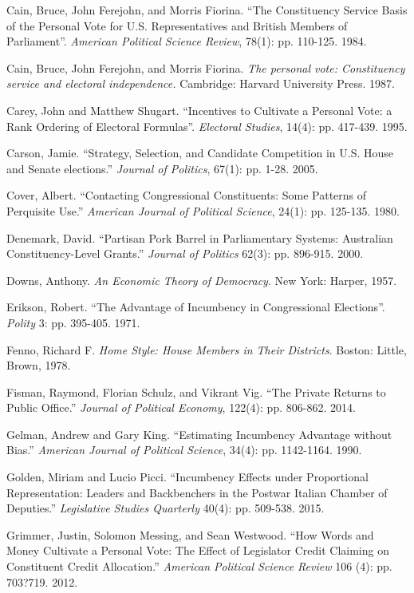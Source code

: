 \documentclass[letter,12pt]{article}
\begin{document}
\begin{hangparas}{.25in}{1}
Cain, Bruce, John Ferejohn, and Morris Fiorina. ``The Constituency Service Basis of the Personal Vote for U.S. Representatives and British Members of Parliament''. \textit{American Political Science Review}, 78(1): pp. 110-125. 1984.

Cain, Bruce, John Ferejohn, and Morris Fiorina. \textit{The personal vote: Constituency service and electoral independence.} Cambridge: Harvard University Press. 1987.

Carey, John and Matthew Shugart. ``Incentives to Cultivate a Personal Vote: a Rank Ordering of Electoral Formulas''. \textit{Electoral Studies}, 14(4): pp. 417-439. 1995.

Carson, Jamie. ``Strategy, Selection, and Candidate Competition in U.S. House and Senate elections.'' \textit{Journal of Politics}, 67(1): pp. 1-28. 2005.

Cover, Albert. ``Contacting Congressional Constituents: Some Patterns of Perquisite Use.'' \textit{American Journal of Political Science}, 24(1): pp. 125-135. 1980.

Denemark, David. ``Partisan Pork Barrel in Parliamentary Systems: Australian Constituency-Level Grants.'' \textit{Journal of Politics} 62(3): pp. 896-915. 2000.

Downs, Anthony. \textit{An Economic Theory of Democracy}. New York: Harper, 1957.

Erikson, Robert. ``The Advantage of Incumbency in Congressional Elections''. \textit{Polity} 3: pp. 395-405. 1971.

Fenno, Richard F. \textit{Home Style: House Members in Their Districts}. Boston: Little, Brown, 1978.

Fisman, Raymond, Florian Schulz, and Vikrant Vig. ``The Private Returns to Public Office.'' \textit{Journal of Political Economy}, 122(4): pp. 806-862. 2014.

Gelman, Andrew and Gary King. ``Estimating Incumbency Advantage without Bias.'' \textit{American Journal of Political Science}, 34(4): pp. 1142-1164. 1990.

Golden, Miriam and Lucio Picci. ``Incumbency Effects under Proportional Representation: Leaders and Backbenchers in the Postwar Italian Chamber of Deputies.'' \textit{Legislative Studies Quarterly} 40(4): pp. 509-538. 2015.

Grimmer, Justin, Solomon Messing, and Sean Westwood. ``How Words and Money Cultivate a Personal Vote: The Effect of Legislator Credit Claiming on Constituent Credit Allocation.'' \textit{American Political Science Review} 106 (4): pp. 703?719. 2012.


\end{hangparas}
\end{document}
